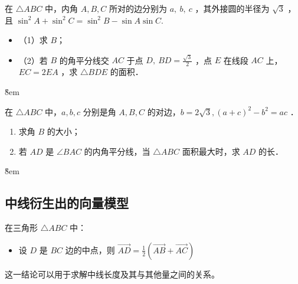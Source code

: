 \begin{problem}
在 $\triangle A B C$ 中，内角 $A, B, C$ 所对的边分别为 $a, ~ b, ~ c$ ，其外接圆的半径为 $\sqrt{3}$ ，且 $\sin ^2 A+\sin ^2 C=\sin ^2 B-\sin A \sin C$.
\begin{itemize}
    \item （1）求 $B$；
    \item （2）若 $B$ 的角平分线交 $A C$ 于点 $D, ~ B D=\frac{\sqrt{3}}{2}$ ，点 $E$ 在线段 $A C$ 上，$E C=2 E A$ ，求 $\triangle B D E$ 的面积．
\end{itemize}
\end{problem}
\v{8em}

\begin{problem}
在 $\triangle A B C$ 中，$a, b, c$ 分别是角 $A, B, C$ 的对边，$b=2 \sqrt{3},(a+c)^2-b^2=a c$ ．
\begin{enumerate}
    \item 求角 $B$ 的大小；
    \item 若 $A D$ 是 $\angle B A C$ 的内角平分线，当 $\triangle A B C$ 面积最大时，求 $A D$ 的长．
\end{enumerate}
\end{problem}
\v{8em}

\subsection{中线衍生出的向量模型}

\begin{theorem}[中线向量]
    \begin{minipage}[c]{0.6\textwidth}
        在三角形 $\triangle ABC$ 中：
        \begin{itemize}
            \item 设 $D$ 是 $BC$ 边的中点，则 $\overrightarrow{AD} = \frac{1}{2}(\overrightarrow{AB}+\overrightarrow{AC})$
        \end{itemize}
        这一结论可以用于求解中线长度及其与其他量之间的关系。
    \end{minipage}
    \begin{minipage}[c]{0.4\textwidth}
    \end{minipage}
\end{theorem}

